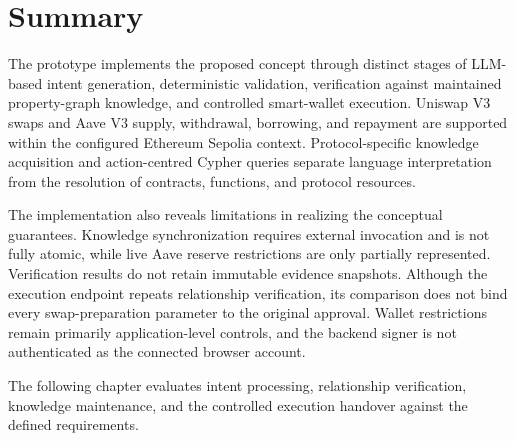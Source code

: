 
\section{Summary}
\label{sec:implementation_summary}

The prototype implements the proposed concept through distinct
stages of LLM-based intent generation, deterministic validation,
verification against maintained property-graph knowledge, and
controlled smart-wallet execution. Uniswap V3 swaps and Aave V3
supply, withdrawal, borrowing, and repayment are supported within
the configured Ethereum Sepolia context. Protocol-specific
knowledge acquisition and action-centred Cypher queries separate
language interpretation from the resolution of contracts, functions,
and protocol resources.

The implementation also reveals limitations in realizing the
conceptual guarantees. Knowledge synchronization requires external
invocation and is not fully atomic, while live Aave reserve
restrictions are only partially represented. Verification results
do not retain immutable evidence snapshots. Although the execution
endpoint repeats relationship verification, its comparison does not
bind every swap-preparation parameter to the original approval.
Wallet restrictions remain primarily application-level controls,
and the backend signer is not authenticated as the connected
browser account.

The following chapter evaluates intent processing, relationship
verification, knowledge maintenance, and the controlled execution
handover against the defined requirements.

